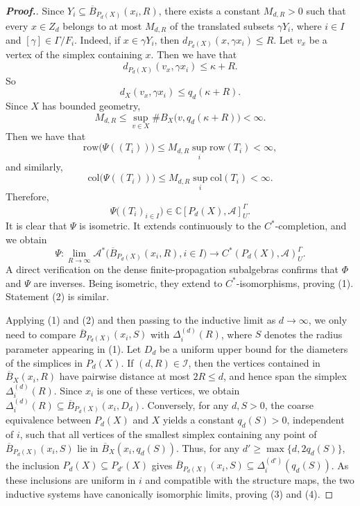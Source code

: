 \documentclass[pdflatex]{sn-jnl}
\theoremstyle{plain}
\theoremstyle{definition}
\begin{document}
\begin{proof}[\textbf{Proof.}]
Since
$Y_i\subseteq\overline B_{P_{d}(X)}(x_i,R)$,
there exists a constant $M_{d,R}>0$ such that every $x\in Z_{d}$
belongs to at most $M_{d,R}$ of the translated subsets
$\gamma Y_i$, where $i\in I$ and $[\gamma]\in\Gamma/F_i$.
Indeed, if $x\in\gamma Y_i$, then
$d_{P_{d}(X)}(x,\gamma x_i)\leq R$.
Let $v_x$ be a vertex of the simplex containing $x$. Then we have that
\[d_{P_{d}(X)}(v_x,\gamma x_i)\leq\kappa+R.\]
So
\[d_X(v_x,\gamma x_i)\leq q_{d}(\kappa+R).\]
Since $X$ has bounded geometry,
\[M_{d,R}\leq\sup_{v\in X}\#B_X\bigl(v,q_{d}(\kappa+R)\bigr)
<\infty.
\]
Then we have that
\[
\text{row}\bigl(\Psi((T_i))\bigr)
\leq
M_{d,R}\sup_{i}\text{row}(T_i)<\infty,
\]
and similarly,
\[
\text{col}\bigl(\Psi((T_i))\bigr)
\leq
M_{d,R}\sup_i\text{col}(T_i)<\infty.
\]
Therefore, 
\[
\Psi\bigl((T_i)_{i\in I}\bigr)\in\mathbb C[P_{d}(X),\mathcal{A}]^\Gamma_U.
\]
It is clear that $\Psi$ is isometric. It extends continuously to the $C^{*}$-completion, and we obtain
\[\Psi:\lim_{R\to\infty}\mathcal{A}^{*}\bigl(\overline{B}_{P_{d}(X)}(x_i,R),i\in I\bigr)\longrightarrow C^{*}(P_{d}(X),\mathcal{A})_{U}^\Gamma.\]
A direct verification on the dense finite-propagation subalgebras confirms that $\Phi$ and $\Psi$ are inverses. Being isometric, they extend to $C^{*}$-isomorphisms, proving (1). Statement (2) is similar.

Applying (1) and (2) and then passing to the inductive limit as $d\to\infty$, we only need to compare $\overline{B}_{P_{d}(X)}(x_i,S)$ with $\Delta_i^{(d)}(R)$, where $S$ denotes the radius parameter appearing in (1). Let $D_{d}$ be a uniform upper bound for the diameters of the simplices in $P_{d}(X)$. If $(d,R)\in\mathcal I$, then the vertices contained in $\overline{B}_X(x_i,R)$ have pairwise distance at most $2R\leq d$, and hence span the simplex $\Delta_i^{(d)}(R)$. Since $x_i$ is one of these vertices, we obtain $\Delta_i^{(d)}(R)\subseteq\overline{B}_{P_{d}(X)}(x_i,D_{d})$. Conversely, for any $d,S>0$, the coarse equivalence between $P_{d}(X)$ and $X$ yields a constant $q_{d}(S)>0$, independent of $i$, such that all vertices of the smallest simplex containing any point of $\overline{B}_{P_{d}(X)}(x_i,S)$ lie in $\overline{B}_X(x_i,q_{d}(S))$. Thus, for any $d'\geq\max\{d,2q_{d}(S)\}$, the inclusion $P_{d}(X)\subseteq P_{d'}(X)$ gives $\overline{B}_{P_{d}(X)}(x_i,S)\subseteq\Delta_i^{(d')}(q_{d}(S))$. As these inclusions are uniform in $i$ and compatible with the structure maps, the two inductive systems have canonically isomorphic limits, proving (3) and (4).
\end{proof}
\end{document}
